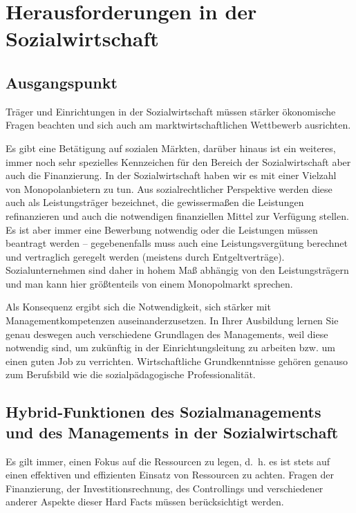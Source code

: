 \documentclass[
  letterpaper,
]{book}
\begin{document}
\chapter{Herausforderungen in der
Sozialwirtschaft}\label{herausforderungen-sozialwirtschaft}

\section{Ausgangspunkt}\label{sozialwirtschaft-ausgangspunkt}

Träger und Einrichtungen in der Sozialwirtschaft müssen stärker
ökonomische Fragen beachten und sich auch am marktwirtschaftlichen
Wettbewerb ausrichten.

Es gibt eine Betätigung auf sozialen Märkten, darüber hinaus ist ein
weiteres, immer noch sehr spezielles Kennzeichen für den Bereich der
Sozialwirtschaft aber auch die Finanzierung. In der Sozialwirtschaft
haben wir es mit einer Vielzahl von Monopolanbietern zu tun. Aus
sozialrechtlicher Perspektive werden diese auch als Leistungsträger
bezeichnet, die gewissermaßen die Leistungen refinanzieren und auch die
notwendigen finanziellen Mittel zur Verfügung stellen. Es ist aber immer
eine Bewerbung notwendig oder die Leistungen müssen beantragt werden --
gegebenenfalls muss auch eine Leistungsvergütung berechnet und
vertraglich geregelt werden (meistens durch Entgeltverträge).
Sozialunternehmen sind daher in hohem Maß abhängig von den
Leistungsträgern und man kann hier größtenteils von einem Monopolmarkt
sprechen.

Als Konsequenz ergibt sich die Notwendigkeit, sich stärker mit
Managementkompetenzen auseinanderzusetzen. In Ihrer Ausbildung lernen
Sie genau deswegen auch verschiedene Grundlagen des Managements, weil
diese notwendig sind, um zukünftig in der Einrichtungsleitung zu
arbeiten bzw. um einen guten Job zu verrichten. Wirtschaftliche
Grundkenntnisse gehören genauso zum Berufsbild wie die
sozialpädagogische Professionalität.

\section{Hybrid-Funktionen des Sozialmanagements und des Managements in
der Sozialwirtschaft}\label{sozialwirtschat-hybriditaet}

Es gilt immer, einen Fokus auf die Ressourcen zu legen, d.~h. es ist
stets auf einen effektiven und effizienten Einsatz von Ressourcen zu
achten. Fragen der Finanzierung, der Investitionsrechnung, des
Controllings und verschiedener anderer Aspekte dieser Hard Facts müssen
berücksichtigt werden.
\end{document}
